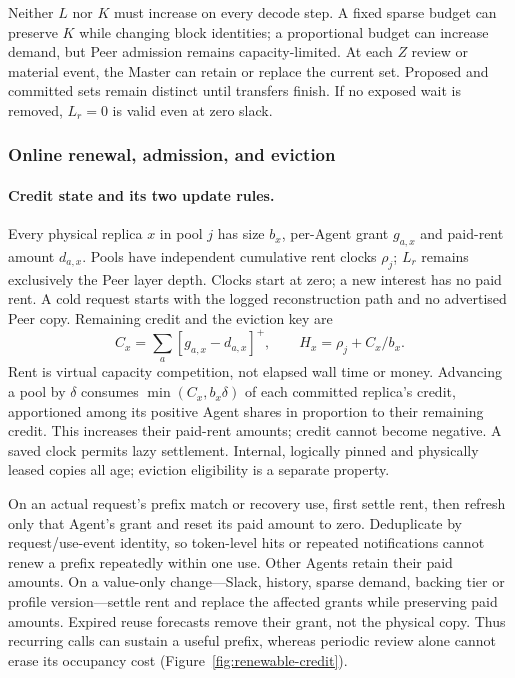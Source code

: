 Neither $L$ nor $K$ must increase on every decode step. A fixed sparse
budget can preserve $K$ while changing block identities; a proportional
budget can increase demand, but Peer admission remains capacity-limited.
At each $Z$ review or material event, the Master can retain or replace the
current set. Proposed and committed sets remain distinct until transfers
finish. If no exposed wait is removed, $L_r=0$ is valid even at zero slack.

\subsubsection{Online renewal, admission, and eviction}
\label{sec:placement-plan}

\paragraph{Credit state and its two update rules.}
Every physical replica $x$ in pool $j$ has size $b_x$, per-Agent grant
$g_{a,x}$ and paid-rent amount $d_{a,x}$. Pools have independent cumulative
rent clocks $\rho_j$; $L_r$ remains exclusively the Peer layer depth.
Clocks start at zero; a new interest has no paid rent. A cold request
starts with the logged reconstruction path and no advertised Peer copy.
Remaining credit and the eviction key are
\begin{equation}
 C_x=\sum_a[g_{a,x}-d_{a,x}]^+,
 \qquad H_x=\rho_j+C_x/b_x.
 \label{eq:rental-credit}
\end{equation}
Rent is virtual capacity competition, not elapsed wall time or money.
Advancing a pool by $\delta$ consumes $\min(C_x,b_x\delta)$ of each
committed replica's credit, apportioned among its positive Agent shares
in proportion to their remaining credit. This increases their paid-rent
amounts; credit cannot become negative. A saved clock permits lazy
settlement. Internal, logically pinned and physically leased copies all
age; eviction eligibility is a separate property.

On an actual request's prefix match or recovery use, first settle rent,
then refresh only that Agent's grant and reset its paid amount to zero.
Deduplicate by request/use-event identity, so token-level hits or repeated
notifications cannot renew a prefix repeatedly within one use. Other
Agents retain their paid amounts. On a value-only change---Slack,
history, sparse demand, backing tier or profile version---settle rent
and replace the affected grants while preserving paid amounts. Expired
reuse forecasts remove their grant, not the physical copy. Thus recurring
calls can sustain a useful prefix, whereas periodic review alone cannot
erase its occupancy cost (Figure~\ref{fig:renewable-credit}).


